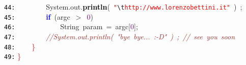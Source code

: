 \documentclass{article}
\begin{document}
\mbox{}\texttt{\textcolor{Black}{44:}} \ \ \ \ \ \ \ \ System\textcolor{BrickRed}{.}out\textcolor{BrickRed}{.}\textbf{\textcolor{Black}{println}}\textcolor{BrickRed}{(}\ \texttt{\textcolor{Red}{"{}}}\texttt{\textcolor{CarnationPink}{\textbackslash{}t}}\texttt{\textcolor{Red}{http://www.lorenzobettini.it"{}}}\ \textcolor{BrickRed}{)}\ \textcolor{BrickRed}{;} \\
\mbox{}\texttt{\textcolor{Black}{45:}} \ \ \ \ \ \ \ \ \textbf{\textcolor{Blue}{if}}\ \textcolor{BrickRed}{(}argc\ \textcolor{BrickRed}{$>$}\ \textcolor{Purple}{0}\textcolor{BrickRed}{)} \\
\mbox{}\texttt{\textcolor{Black}{46:}} \ \ \ \ \ \ \ \ \ \ \ \ String\ param\ \textcolor{BrickRed}{=}\ argc\textcolor{BrickRed}{[}\textcolor{Purple}{0}\textcolor{BrickRed}{];} \\
\mbox{}\texttt{\textcolor{Black}{47:}} \ \ \ \ \ \ \ \ \textit{\textcolor{Brown}{//System.out.println(\ "{}bye\ bye...\ :-D"{}\ )\ ;\ //\ see\ you\ soon}} \\
\mbox{}\texttt{\textcolor{Black}{48:}} \ \ \ \ \textcolor{Red}{\}} \\
\mbox{}\texttt{\textcolor{Black}{49:}} \textcolor{Red}{\}} \\
\end{document}
